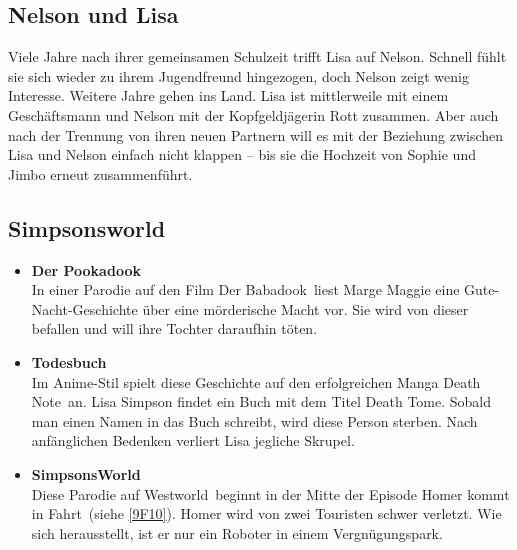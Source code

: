 
\subsection{Nelson und Lisa}
Viele Jahre nach ihrer gemeinsamen Schulzeit trifft Lisa auf Nelson. Schnell fühlt sie sich wieder zu ihrem Jugendfreund hingezogen, doch Nelson zeigt wenig Interesse. Weitere Jahre gehen ins Land. Lisa ist mittlerweile mit einem Geschäftsmann und Nelson mit der Kopfgeldjägerin Rott zusammen. Aber auch nach der Trennung von ihren neuen Partnern will es mit der Beziehung zwischen Lisa und Nelson einfach nicht klappen -- bis sie die Hochzeit von Sophie und Jimbo erneut zusammenführt.


\subsection{Simpsonsworld}
\begin{itemize}
	\item \textbf{Der Pookadook}\\ In einer Parodie auf den Film \glqq Der Babadook\grqq\ liest Marge Maggie eine Gute-Nacht-Geschichte über eine mörderische Macht vor. Sie wird von dieser befallen und will ihre Tochter daraufhin töten.
	\item \textbf{Todesbuch}\\ Im Anime-Stil spielt diese Geschichte auf den erfolgreichen Manga \glqq Death Note\grqq\ an. Lisa Simpson findet ein Buch mit dem Titel \glqq Death Tome\grqq . Sobald man einen Namen in das Buch schreibt, wird diese Person sterben. Nach anfänglichen Bedenken verliert Lisa jegliche Skrupel.
	\item \textbf{SimpsonsWorld}\\ Diese Parodie auf \grqq Westworld\grqq\ beginnt in der Mitte der Episode \glqq Homer kommt in Fahrt\grqq\ (siehe \ref{9F10}). Homer wird von zwei Touristen schwer verletzt. Wie sich herausstellt, ist er nur ein Roboter in einem Vergnügungspark.
\end{itemize}

